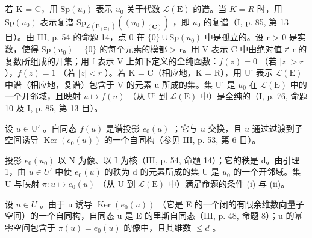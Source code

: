 若 K = C，用 \(\mathrm{Sp}(u_{0})\) 表示 \(u_{0}\) 关于代数 \(\mathcal{L}(\mathrm{E})\) 的谱。当 \(K = R\) 时，用 \(\mathrm{Sp}(u_{0})\) 表示复谱 \(\mathrm{Sp}_{\mathcal{L}(\mathrm{E}_{(\mathbf{C})})}((u_{0})_{(\mathbf{C})})\) ，即 \(u_{0}\) 的复谱（I, p. 85, 第 13 目）。由 III, p. 54 的命题 14，点 0 在 \(\{0\} \cup \mathrm{Sp}(u_{0})\) 中是孤立的。设 r \textgreater{} 0 是实数，使得 \(\mathrm{Sp}(u_{0}) - \{0\}\) 的每个元素的模都 \textgreater{} r。用 V 表示 C 中由绝对值 ≠ r 的复数所组成的开集；用 f 表示 V 上如下定义的全纯函数：\(f(z) = 0\) （若 \(|z| > r\) ），\(f(z) = 1\) （若 \(|z| < r\) ）。若 K = C（相应地，K = R），用 U' 表示 \(\mathcal{L}(\mathrm{E})\) 中谱（相应地，复谱）包含于 V 的元素 u 所成的集。集 U' 是 \(u_{0}\) 在 \(\mathcal{L}(\mathrm{E})\) 中的一个开邻域，且映射 \(u \mapsto f(u)\) （从 U' 到 \(\mathcal{L}(\mathrm{E})\) 中）是全纯的（I, p. 76, 命题 10 及 I, p. 85, 第 13 目）。

设 \(u \in \mathrm{U}'\) 。自同态 \(f(u)\) 是谱投影 \(e_0(u)\) ；它与 \(u\) 交换，且 \(u\) 通过过渡到子空间诱导 \(\operatorname{Ker}(e_0(u))\) 的一个自同构（参见 III, p. 53, 第 6 目）。

投影 \(e_{0}(u_{0})\) 以 N 为像、以 I 为核（III, p. 54, 命题 14）；它的秩是 d。由引理 1，由 \(u \in U'\) 中使 \(e_{0}(u)\) 的秩为 d 的元素所成的集 U 是 \(u_{0}\) 的一个开邻域。集 U 与映射 \(\pi: u \mapsto e_{0}(u)\) （从 U 到 \(\mathcal{L}(\mathrm{E})\) 中）满足命题的条件 (i) 与 (ii)。

设 \(u \in U\) 。由于 u 诱导 \(\operatorname{Ker}(e_{0}(u))\) （它是 E 的一个闭的有限余维数向量子空间）的一个自同构，自同态 u 是 E 的里斯自同态（III, p. 48, 命题 8）；u 的幂零空间包含于 \(\pi(u) = e_{0}(u)\) 的像中，且其维数 \(\leqslant d\) 。

